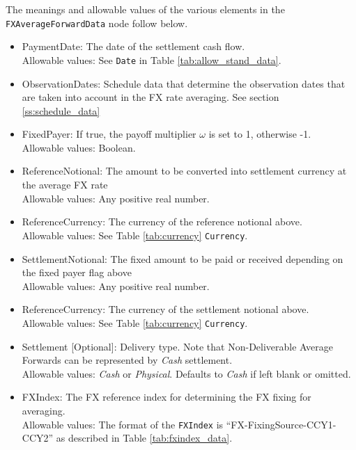 The meanings and allowable values of the various elements in the \lstinline!FXAverageForwardData! node follow below.

\begin{itemize}
\item PaymentDate: The date of the settlement cash flow. \\ Allowable values:  See \lstinline!Date! in Table \ref{tab:allow_stand_data}.
\item ObservationDates: Schedule data that determine the observation dates that are taken into account in the FX rate averaging. See section \ref{ss:schedule_data}
\item FixedPayer: If true, the payoff multiplier $\omega$ is set to 1, otherwise -1.  \\ Allowable values:  Boolean.
\item ReferenceNotional: The amount to be converted into settlement currency at the average FX rate \\ Allowable values:  Any positive real number.
\item ReferenceCurrency: The currency of the reference notional above.  \\ Allowable values: See Table \ref{tab:currency}  \lstinline!Currency!.
\item SettlementNotional: The fixed amount to be paid or received depending on the fixed payer flag above \\ Allowable values:  Any positive real number.
\item ReferenceCurrency: The currency of the settlement notional above. \\ Allowable values: See Table \ref{tab:currency}  \lstinline!Currency!.
\item Settlement [Optional]: Delivery type.  Note that Non-Deliverable Average Forwards can be represented by \emph{Cash} settlement. \\
Allowable values: \emph{Cash} or \emph{Physical}.  Defaults to \emph{Cash} if left blank or omitted.
\item FXIndex: The FX reference index for determining the FX fixing for averaging.  \\
Allowable values: The format of the \lstinline!FXIndex! is ``FX-FixingSource-CCY1-CCY2'' as described in Table \ref{tab:fxindex_data}.
\end{itemize}
